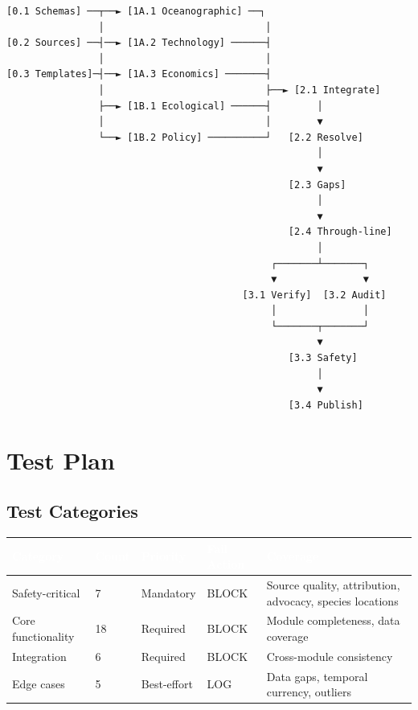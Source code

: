 \documentclass[11pt,letterpaper]{article}
\newcommand{\tableheader}[1]{\textbf{\sffamily\textcolor{white}{#1}}}
\begin{document}
\begin{asciibox}
\begin{verbatim}
[0.1 Schemas] ──┬──► [1A.1 Oceanographic] ──┐
                │                            │
[0.2 Sources] ──┤──► [1A.2 Technology] ──────┤
                │                            │
[0.3 Templates]─┤──► [1A.3 Economics] ───────┤
                │                            ├──► [2.1 Integrate]
                ├──► [1B.1 Ecological] ──────┤        │
                │                            │        ▼
                └──► [1B.2 Policy] ──────────┘   [2.2 Resolve]
                                                      │
                                                      ▼
                                                 [2.3 Gaps]
                                                      │
                                                      ▼
                                                 [2.4 Through-line]
                                                      │
                                              ┌───────┴───────┐
                                              ▼               ▼
                                         [3.1 Verify]  [3.2 Audit]
                                              │               │
                                              └───────┬───────┘
                                                      ▼
                                                 [3.3 Safety]
                                                      │
                                                      ▼
                                                 [3.4 Publish]
\end{verbatim}
\end{asciibox}

\section{Test Plan}

\subsection{Test Categories}

\begin{center}
\begin{tabularx}{\textwidth}{L{3cm}C{1.2cm}C{1.5cm}C{1.8cm}X}
\toprule
{}
\tableheader{Category} & \tableheader{Count} & \tableheader{Priority} & \tableheader{Fail Action} & \tableheader{Coverage} \\
\midrule
Safety-critical & 7 & Mandatory & BLOCK & Source quality, attribution, advocacy, species locations \\
Core functionality & 18 & Required & BLOCK & Module completeness, data coverage \\
Integration & 6 & Required & BLOCK & Cross-module consistency \\
Edge cases & 5 & Best-effort & LOG & Data gaps, temporal currency, outliers \\
\bottomrule
\end{tabularx}
\end{center}
\end{document}
